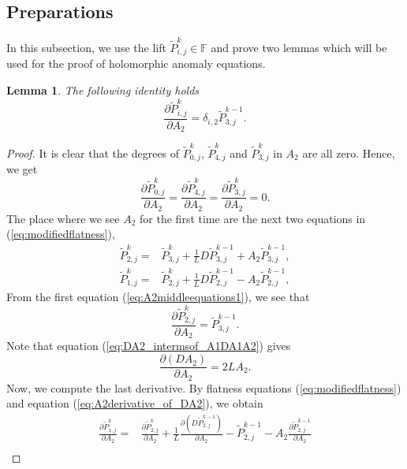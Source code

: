 \documentclass[12pt]{amsart}
\newtheorem{lem}[prop]{Lemma}
\numberwithin{equation}{section}
\begin{document}
\subsection{Preparations}
In this subsection, we use the lift $\widetilde{P}_{i,j}^k\in\mathbb{F}$ and prove two lemmas which will be used for the proof of holomorphic anomaly equations.
\begin{lem}\label{lem:derivativeof_Pijk_wrtA2}
The following identity holds
\begin{equation*}
\frac{\partial\widetilde{P}_{i,j}^k}{\partial{A_2}}=\delta_{i,2}\widetilde{P}_{{3},j}^{k-1}.
\end{equation*}
\end{lem}
\begin{proof}
It is clear that the degrees of $\widetilde{P}_{0,j}^k$, $\widetilde{P}_{4,j}^k$ and $\widetilde{P}_{3,j}^k$ in $A_2$ are all zero. Hence, we get
\begin{equation}
\frac{\partial\widetilde{P}_{0,j}^k}{\partial{A_2}}=\frac{\partial\widetilde{P}_{4,j}^k}{\partial{A_2}}=\frac{\partial\widetilde{P}_{3,j}^k}{\partial{A_2}}=0.
\end{equation}
The place where we see $A_2$ for the first time are the next two equations in (\ref{eq:modifiedflatness}),
\begin{align}
\widetilde{P}_{2,j}^k=&\widetilde{P}_{3,j}^k+\frac{1}{L}D\widetilde{P}_{3,j}^{k-1}+A_2\widetilde{P}_{3,j}^{k-1},\label{eq:A2middleequations1}\\
\widetilde{P}_{1,j}^k=&\widetilde{P}_{2,j}^k+\frac{1}{L}D\widetilde{P}_{2,j}^{k-1}-A_2\widetilde{P}_{2,j}^{k-1},\label{eq:A2middleequations2}
\end{align}
From the first equation (\ref{eq:A2middleequations1}), we see that
\begin{equation*}\label{eq:A2derivative_of_P2jk}
\frac{\partial\widetilde{P}_{2,j}^k}{\partial{A_2}}=\widetilde{P}_{3,j}^{k-1}.
\end{equation*}
Note that equation (\ref{eq:DA2_intermsof_A1DA1A2}) gives
\begin{equation*}\label{eq:A2derivative_of_DA2}
\frac{\partial \left(DA_2\right)}{\partial A_2}=2LA_2.
\end{equation*}
Now, we compute the last derivative. By flatness equations (\ref{eq:modifiedflatness}) and equation (\ref{eq:A2derivative_of_DA2}), we obtain
\begin{equation}
\begin{aligned}
\frac{\partial \widetilde{P}_{1,j}^k}{\partial A_2}=&\frac{\partial \widetilde{P}_{2,j}^k}{\partial A_2}+\frac{1}{L}\frac{\partial\left(D\widetilde{P}_{2,j}^{k-1}\right)}{\partial A_2}-\widetilde{P}_{2,j}^{k-1}-A_2\frac{\partial \widetilde{P}_{2,j}^{k-1}}{\partial A_2}\\

\end{aligned}
\end{equation}
\end{proof}
\end{document}
